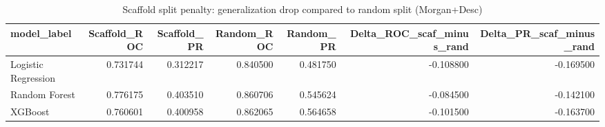 \begin{table}
\caption{Scaffold split penalty: generalization drop compared to random split (Morgan+Desc)}
\label{tab:scaffold_penalty}
\begin{tabular}{lrrrrrr}
\toprule
model_label & Scaffold_ROC & Scaffold_PR & Random_ROC & Random_PR & Delta_ROC_scaf_minus_rand & Delta_PR_scaf_minus_rand \\
\midrule
Logistic Regression & 0.731744 & 0.312217 & 0.840500 & 0.481750 & -0.108800 & -0.169500 \\
Random Forest & 0.776175 & 0.403510 & 0.860706 & 0.545624 & -0.084500 & -0.142100 \\
XGBoost & 0.760601 & 0.400958 & 0.862065 & 0.564658 & -0.101500 & -0.163700 \\
\bottomrule
\end{tabular}
\end{table}
